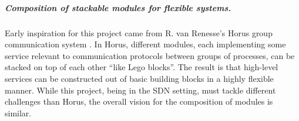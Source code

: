 \documentclass{article}
\begin{document}
\subparagraph{Composition of stackable modules for flexible systems.}

Early inspiration for this project came from R. van Renesse's Horus group 
communication system \cite{horus}. 
In Horus, different modules, each implementing some service relevant 
to communication protocols between groups of processes,
can be stacked on top of each other ``like Lego blocks''.
The result is that high-level services can be constructed out of basic building
blocks in a highly flexible manner.
While this project, being in the SDN setting, must tackle different challenges
than Horus, the overall vision for the composition of modules is similar.

\printbibliography

  
\end{document}
